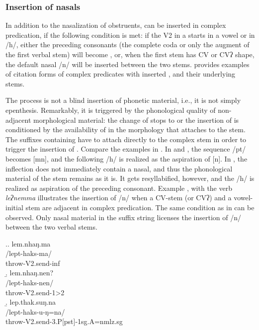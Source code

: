 \subsubsection{Insertion of nasals}

In addition to the nasalization of obstruents,  can be inserted in complex predication, if the following condition is met: if the V2 in a  starts in a vowel or in /h/, either the preceding consonants (the complete coda or only the augment of the first verbal stem) will become , or, when the first stem has CV or CVʔ shape, the default nasal /n/ will be inserted between the two stems.  provides examples of citation forms of complex predicates with inserted , and their underlying stems. 


The process is not a blind insertion of phonetic material, i.e., it is not simply epenthesis. Remarkably, it is triggered by the phonological quality of non-adjacent morphological material: the change of stops to  or the insertion of  is conditioned by the availability of  in the morphology that attaches to the stem. The suffixes containing  have to attach directly to the complex stem in order to trigger the insertion of . Compare the examples in \Next. In \Next[a] and \Next[b], the sequence /pt/ becomes [mn], and the following /h/ is realized  as the aspiration of [n]. In \Next[c], the inflection does not immediately contain a nasal, and thus the phonological material of the stem remains as it is. It gets resyllabified, however, and the /h/ is realized as aspiration of the preceding consonant. Example \NNext, with the verb \emph{leʔnemma}  illustrates the insertion of /n/ when a CV-stem (or CVʔ) and a vowel-initial stem are adjacent in complex predication. The same condition as in \Next can be observed. Only nasal material in the suffix string licenses the insertion of /n/ between the two verbal stems. 


\ex.\a. \glll lem.nhaŋ.ma\\
/lept-haks-ma/\\
throw{\sc -V2.send-inf}\\
\b. \glll lem.nhaŋ.nen?\\
/lept-haks-nen/\\
throw{\sc -V2.send-1>2}\\
\b. \glll lep.thak.suŋ.na\\
/lept-haks-u-ŋ=na/\\
throw{\sc -V2.send-3.P[pst]-1sg.A=nmlz.sg}\\

